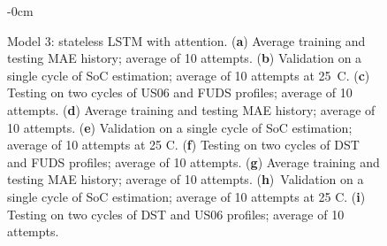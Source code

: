\begin{figure}[H]
\begin{adjustwidth}{-\extralength}{0cm}
\begin{subfigure}[b]{0.425\textwidth}
    \end{subfigure}
    \hfill
    \begin{subfigure}[b]{0.425\textwidth}
        \centering
        
        \caption{\vspace{+2pt}\centering}
    \end{subfigure}
    \hfill
    \begin{subfigure}[b]{0.425\textwidth}
        \centering
        
        \caption{\vspace{+2pt}\centering}
        \label{subfig:Model-3res-testing}
    \end{subfigure}
    \end{adjustwidth}
    \caption{Model 3: stateless LSTM with attention. (\textbf{a}) Average training and testing MAE history; average of 10 attempts. (\textbf{b}) Validation on a single cycle of SoC estimation; average of 10 attempts at 25~\textdegree{}C. (\textbf{c}) Testing on two cycles of US06 and FUDS profiles; average of 10 attempts. (\textbf{d}) Average training and testing MAE history; average of 10 attempts. (\textbf{e}) Validation on a single cycle of SoC estimation; average of 10 attempts at 25 \textdegree{}C. (\textbf{f}) Testing on two cycles of DST and FUDS profiles; average of 10 attempts. (\textbf{g}) Average training and testing MAE history; average of 10 attempts. (\textbf{h})~Validation on a single cycle of SoC estimation; average of 10 attempts at 25 \textdegree{}C. (\textbf{i}) Testing on two cycles of DST and US06 profiles; average of 10 attempts.}
    \label{fig:Model-3res}
\end{figure}
\clearpage
